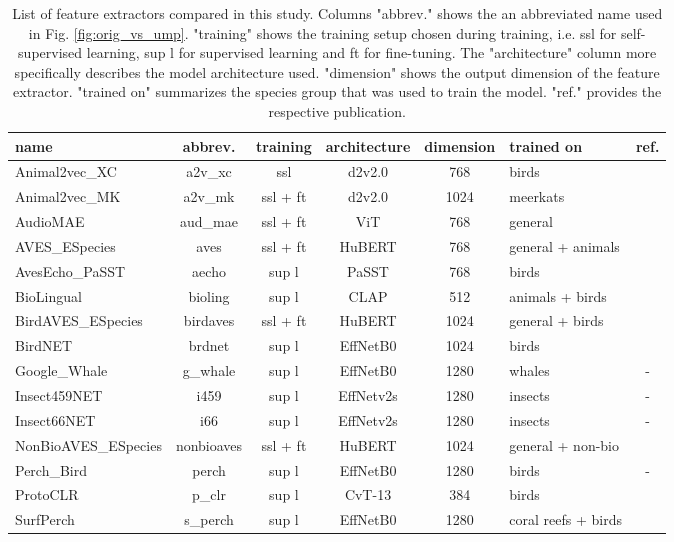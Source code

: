
\begin{table*}[t]
  
  \caption{List of feature extractors compared in this study. Columns "abbrev." shows the an abbreviated name used in Fig. \ref{fig:orig_vs_ump}. "training" shows the training setup chosen during training, i.e. ssl for self-supervised learning, sup l for supervised learning and ft for fine-tuning. The "architecture" column more specifically describes the model architecture used. "dimension" shows the output dimension of the feature extractor. "trained on" summarizes the species group that was used to train the model. "ref." provides the respective publication.}
  \label{tab:bacpipe_models}

  \centering
  \begin{tabular}{l|c|c|c|c|l|c}
    name& abbrev. & 
    training & architecture &
    dimension & trained on & ref.\\
    \hline
    Animal2vec\_XC      & a2v\_xc   & ssl & d2v2.0 & 768 & birds & \cite{schafer-zimmermann_animal2vec_2024}\\
    Animal2vec\_MK      & a2v\_mk  & ssl + ft & d2v2.0 & 1024& meerkats & \cite{schafer-zimmermann_animal2vec_2024}\\
    AudioMAE            & aud\_mae  & ssl + ft & ViT 	 & 768 & general & \cite{huang_masked_2022}\\
    AVES\_ESpecies      & aves   & ssl + ft & HuBERT 	 & 768 & general + animals & \cite{hagiwara_aves_2022}\\
    AvesEcho\_PaSST     & aecho   & sup l & PaSST 	 & 768 & birds & \cite{ghani_generalization_2024}\\
    BioLingual          & bioling  & sup l & CLAP 	 & 512 & animals + birds & \cite{robinson_transferable_2023}\\
    BirdAVES\_ESpecies  & birdaves   & ssl + ft & HuBERT 	 & 1024& general + birds & \cite{hagiwara_aves_2022}\\
    BirdNET             & brdnet   & sup l & EffNetB0 	 & 1024& birds & \cite{kahl_birdnet_2021}\\
    Google\_Whale       &  g\_whale  & sup l & EffNetB0 	 & 1280& whales & - \\
    Insect459NET        & i459 & sup l & EffNetv2s 	 & 1280& insects & - \\
    Insect66NET         & i66 & sup l & EffNetv2s 	 & 1280& insects & - \\
    NonBioAVES\_ESpecies& nonbioaves    & ssl + ft & HuBERT 	 & 1024& general + non-bio & \cite{hagiwara_aves_2022}\\
    Perch\_Bird         & perch    & sup l & EffNetB0 	 & 1280& birds & - \\
    ProtoCLR            & p\_clr   & sup l 	 & CvT-13 & 384 & birds & \cite{moummad_domain-invariant_2024}\\
    SurfPerch           &  s\_perch  & sup l & EffNetB0 	 & 1280& coral reefs + birds & \cite{williams_leveraging_2024}\\
  \end{tabular}
\end{table*}
